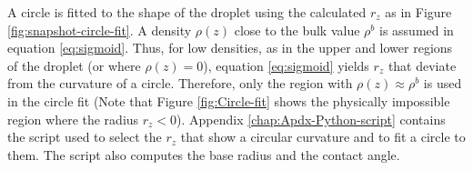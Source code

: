 A circle is fitted to the shape of the droplet using the calculated
$r_{z}$ as in Figure \ref{fig:snapshot-circle-fit}. A density $\rho(z)$
close to the bulk value $\rho^{b}$ is assumed in equation \ref{eq:sigmoid}.
Thus, for low densities, as in the upper and lower regions of the
droplet (or where $\rho(z)=0$), equation \ref{eq:sigmoid} yields
$r_{z}$ that deviate from the curvature of a circle. Therefore, only
the region with $\rho(z)\approx\rho^{b}$ is used in the circle fit
(Note that Figure \ref{fig:Circle-fit} shows the physically impossible
region where the radius $r_{z}<0$). Appendix \ref{chap:Apdx-Python-script}
contains the script used to select the $r_{z}$ that show a circular
curvature and to fit a circle to them. The script also computes the
base radius and the contact angle.